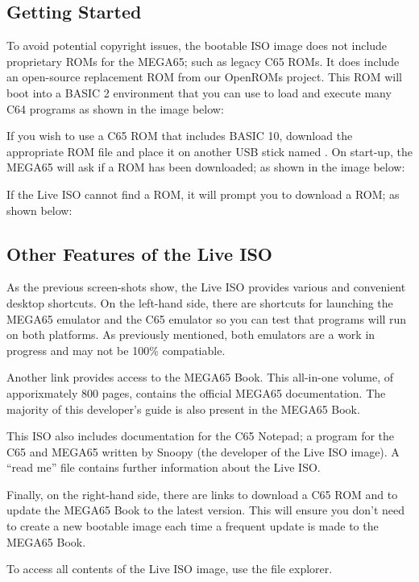 \subsection{Getting Started}

To avoid potential copyright issues, the bootable ISO image does not include proprietary ROMs for the MEGA65; such as legacy C65 ROMs. It does include an open-source replacement ROM from our OpenROMs project. This ROM will boot into a BASIC 2 environment that you can use to load and execute many C64 programs as shown in the image below:


If you wish to use a C65 ROM that includes BASIC 10, download the appropriate ROM file and place it on another USB stick named . On start-up, the MEGA65 will ask if a ROM has been downloaded; as shown in the image below:


If the Live ISO cannot find a ROM, it will prompt you to download a ROM; as shown below:


\subsection{Other Features of the Live ISO}

As the previous screen-shots show, the Live ISO provides various and convenient desktop shortcuts. On the left-hand side, there are shortcuts for launching the
MEGA65 emulator and the C65 emulator so you can test that programs
will run on both platforms. As previously mentioned, both emulators are a work in progress and may not be 100\% compatiable.

Another link provides access to the MEGA65 Book. This all-in-one volume, of apporixmately 800 pages, contains the official MEGA65 documentation. The majority of this developer's guide is also present in the MEGA65 Book.

This ISO also includes documentation for the C65 Notepad; a program for the C65 and MEGA65 written by Snoopy (the developer of the Live ISO image). A ``read me'' file contains further information about the Live ISO.

Finally, on the right-hand side, there are links to download a C65 ROM and to update the MEGA65 Book to the latest version. This will ensure you don't need to create a new bootable image each time a frequent update is made to the MEGA65 Book.

To access all contents of the Live ISO image, use the file explorer.

